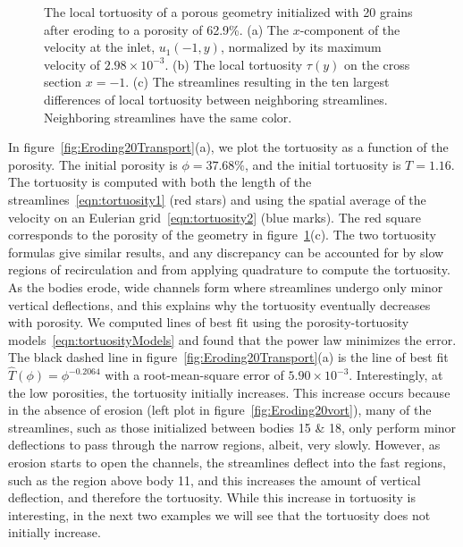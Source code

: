 \documentclass{jfm}
\begin{document}
\begin{figure}
\begin{subfigure}[b]{0.5\textwidth}
\caption{}
\end{subfigure}
\caption{\label{fig:Eroding20tort} The local tortuosity of a porous
geometry initialized with 20 grains after eroding to a porosity of
62.9\%.  (a) The $x$-component of the velocity at the inlet,
$u_1(-1,y)$, normalized by its maximum velocity of $2.98 \times
10^{-3}$. (b) The local tortuosity $\tau(y)$ on the cross section $x =
-1$. (c) The streamlines resulting in the ten largest differences of
local tortuosity between neighboring streamlines.  Neighboring
streamlines have the same color.}
\end{figure}

In figure~\ref{fig:Eroding20Transport}(a), we plot the tortuosity as a
function of the porosity. The initial porosity is $\phi = 37.68\%$, and
the initial tortuosity is $T = 1.16$.  The tortuosity is computed with
both the length of the streamlines~\eqref{eqn:tortuosity1} (red stars)
and using the spatial average of the velocity on an Eulerian
grid~\eqref{eqn:tortuosity2} (blue marks).  The red square corresponds
to the porosity of the geometry in figure~\ref{fig:Eroding20tort}(c).
The two tortuosity formulas give similar results, and any discrepancy
can be accounted for by slow regions of recirculation and from applying
quadrature to compute the tortuosity.  As the bodies erode, wide
channels form where streamlines undergo only minor vertical deflections,
and this explains why the tortuosity eventually decreases with porosity.
We computed lines of best fit using the porosity-tortuosity
models~\eqref{eqn:tortuosityModels} and found that the power law
minimizes the error.  The  black dashed line in
figure~\ref{fig:Eroding20Transport}(a) is the line of best fit
$\widehat{T}(\phi) = \phi^{-0.2064}$ with a root-mean-square error of
$5.90 \times 10^{-3}$.  Interestingly, at the low porosities, the
tortuosity initially increases. This increase occurs because in the
absence of erosion (left plot in figure~\ref{fig:Eroding20vort}), many
of the streamlines, such as those initialized between bodies 15 \& 18,
only perform minor deflections to pass through the narrow regions,
albeit, very slowly.  However, as erosion starts to open the channels,
the streamlines deflect into the fast regions, such as the region above
body 11, and this increases the amount of vertical deflection, and
therefore the tortuosity. While this increase in tortuosity is
interesting, in the next two examples we will see that the tortuosity
does not initially increase.
\end{document}
